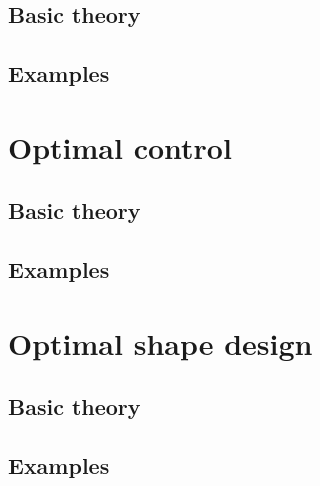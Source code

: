 \documentclass[pdftex, a4paper, 10pt]{book}
\begin{document}
\section{Basic theory}\label{PatternRecognitionBasicTheory}


\section{Examples}\label{ExamplesPatternRecognition}



\chapter{Optimal control}\label{OptimalControl}


\section{Basic theory}\label{BasicTheoryOptimalControl}


\section{Examples}\label{ExamplesOptimalControl}

 
 
\chapter{Optimal shape design}\label{OptimalShapeDesign}


\section{Basic theory}\label{BasicTheoryOptimalShapeDesign}


\section{Examples}\label{ExamplesOptimalShapeDesign}

\end{document}
